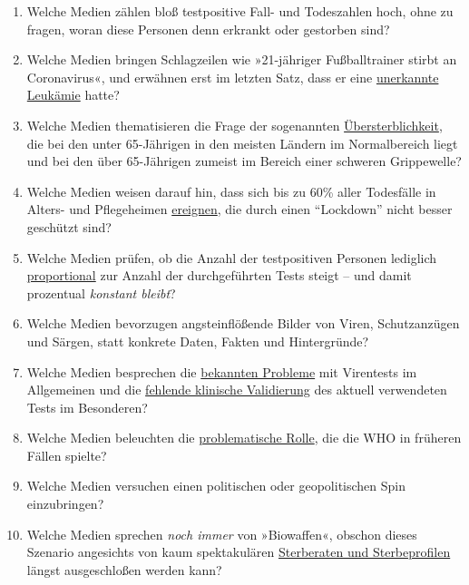 \begin{enumerate}
\def\labelenumi{\arabic{enumi}.}
\tightlist
\item
  Welche Medien zählen bloß testpositive Fall- und Todeszahlen hoch,
  ohne zu fragen, woran diese Personen denn erkrankt oder gestorben
  sind?
\item
  Welche Medien bringen Schlagzeilen wie »21-jähriger Fußballtrainer
  stirbt an Coronavirus«, und erwähnen erst im letzten Satz, dass er
  eine
  \href{https://www.msn.com/de-ch/news/other/spanischer-nachwuchs-trainer-stirbt-an-corona/ar-BB11gT64}{unerkannte
  Leukämie} hatte?
\item
  Welche Medien thematisieren die Frage der sogenannten
  \href{https://www.euromomo.eu/index.html}{Übersterblichkeit}, die bei
  den unter 65-Jährigen in den meisten Ländern im Normalbereich liegt
  und bei den über 65-Jährigen zumeist im Bereich einer schweren
  Grippewelle?
\item
  Welche Medien weisen darauf hin, dass sich bis zu 60\% aller
  Todesfälle in Alters- und Pflegeheimen
  \href{https://ltccovid.org/2020/04/12/mortality-associated-with-covid-19-outbreaks-in-care-homes-early-international-evidence/}{ereignen},
  die durch einen ``Lockdown'' nicht besser geschützt sind?
\item
  Welche Medien prüfen, ob die Anzahl der testpositiven Personen
  lediglich
  \href{https://multipolar-magazin.de/artikel/coronavirus-irrefuhrung-fallzahlen}{proportional}
  zur Anzahl der durchgeführten Tests steigt -- und damit prozentual
  \emph{konstant bleibt}?
\item
  Welche Medien bevorzugen angsteinflößende Bilder von Viren,
  Schutzanzügen und Särgen, statt konkrete Daten, Fakten und
  Hintergründe?
\item
  Welche Medien besprechen die
  \href{https://www.ncbi.nlm.nih.gov/pmc/articles/PMC2095096/}{bekannten
  Probleme} mit Virentests im Allgemeinen und die
  \href{https://www.creative-diagnostics.com/sars-cov-2-coronavirus-multiplex-rt-qpcr-kit-277854-457.htm}{fehlende
  klinische Validierung} des aktuell verwendeten Tests im Besonderen?
\item
  Welche Medien beleuchten die
  \href{https://www.forbes.com/2010/02/05/world-health-organization-swine-flu-pandemic-opinions-contributors-michael-fumento.html\#208eef4048e8}{problematische
  Rolle}, die die WHO in früheren Fällen spielte?
\item
  Welche Medien versuchen einen politischen oder geopolitischen Spin
  einzubringen?
\item
  Welche Medien sprechen \emph{noch immer} von »Biowaffen«, obschon
  dieses Szenario angesichts von kaum spektakulären
  \href{https://www.statnews.com/2020/03/17/a-fiasco-in-the-making-as-the-coronavirus-pandemic-takes-hold-we-are-making-decisions-without-reliable-data/}{Sterberaten
  und Sterbeprofilen} längst ausgeschloßen werden kann?
\end{enumerate}

